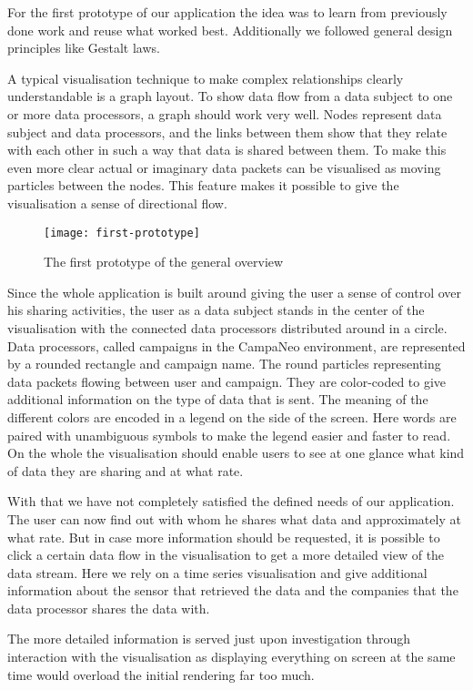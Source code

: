 
For the first prototype of our application the idea was to learn from previously done work and reuse what worked best. Additionally we followed general design principles like Gestalt laws.

A typical visualisation technique to make complex relationships clearly understandable is a graph layout. To show data flow from a data subject to one or more data processors, a graph should work very well. 
Nodes represent data subject and data processors, and the links between them show that they relate with each other in such a way that data is shared between them. 
To make this even more clear actual or imaginary data packets can be visualised as moving particles between the nodes. 
This feature makes it possible to give the visualisation a sense of directional flow.
\begin{figure}
    \centering
    \texttt{[image: first-prototype]}    \caption{The first prototype of the general overview}
    \label{fig:my_label}
\end{figure}

Since the whole application is built around giving the user a sense of control over his sharing activities, the user as a data subject stands in the center of the visualisation with the connected data processors  distributed around in a circle.
Data processors, called campaigns in the CampaNeo environment, are represented by a rounded rectangle and campaign name. The round particles representing data packets flowing between user and campaign. They are color-coded to give additional information on the type of data that is sent. 
The meaning of the different colors are encoded in a legend on the side of the screen. Here words are paired with unambiguous symbols to make the legend easier and faster to read.
On the whole the visualisation should enable users to see at one glance what kind of data they are sharing and at what rate.

With that we have not completely satisfied the defined needs of our application. 
The user can now find out with whom he shares what data and approximately at what rate. 
But in case more information should be requested, it is possible to click a certain data flow in the visualisation to get a more detailed view of the data stream. 
Here we rely on a time series visualisation and give additional information about the sensor that retrieved the data and the companies that the data processor shares the data with.

The more detailed information is served just upon investigation through interaction with the visualisation as displaying everything on screen at the same time would overload the initial rendering far too much.
